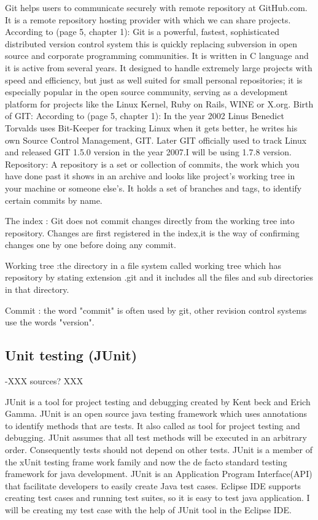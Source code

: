 \documentclass{report}
\begin{document}
Git helps users to communicate securely with remote repository at GitHub.com. It is a remote repository hosting provider with which we can share projects.	
According to \cite{Chacon2011ProGit} (page 5, chapter 1): Git is a powerful, fastest, sophisticated distributed version control system this is quickly replacing subversion in open source and corporate programming communities. It is written in C language and it is active from several years. It designed to handle extremely large projects with speed and efficiency,	but just as well suited for small personal repositories; it is especially popular in the open source community, serving as a development platform for projects like the Linux Kernel, Ruby on Rails, WINE or X.org.
Birth of GIT:
According to \cite{Chacon2011ProGit}(page 5, chapter 1): In the year 2002 Linus Benedict Torvalds uses Bit-Keeper for tracking Linux when it gets better, he writes his own Source Control Management, GIT. Later GIT officially used to track Linux and released GIT 1.5.0 version in the year 2007.I will be using 1.7.8 version.
Repository:  A repository is a set or collection of commits, the work which you have done past it shows in an archive and looks like project's working tree in your machine or someone else's. It holds a set of branches and tags, to identify certain commits by name.

The index : Git does not commit changes directly from the working tree into repository. Changes are first registered in the index,it is the way of confirming changes one by one before doing any commit.																										

Working tree :the directory in a file system called working tree which has repository by stating extension .git and it includes all the files and sub directories in that  directory.

Commit : the word "commit" is often used by git, other revision control systems use the words "version".


\subsection{Unit testing (JUnit)}
\label{sec:junit}

-XXX sources? XXX

JUnit is a tool for project testing and debugging created by Kent beck and Erich Gamma.
JUnit is an open source java testing framework which uses annotations to identify methods that are tests. It also called as tool for project testing and debugging. JUnit assumes that all test methods will be executed in an arbitrary order. Consequently tests should not depend on other tests.
JUnit is a member of the xUnit testing frame work family and now the de facto standard testing framework for java development. JUnit is an Application Program Interface(API) that facilitate developers to easily create Java test cases.
Eclipse IDE supports creating test cases and running test suites, so it is easy to test java application.
I will be creating my test case with the help of JUnit tool in the Eclipse IDE.
\end{document}
